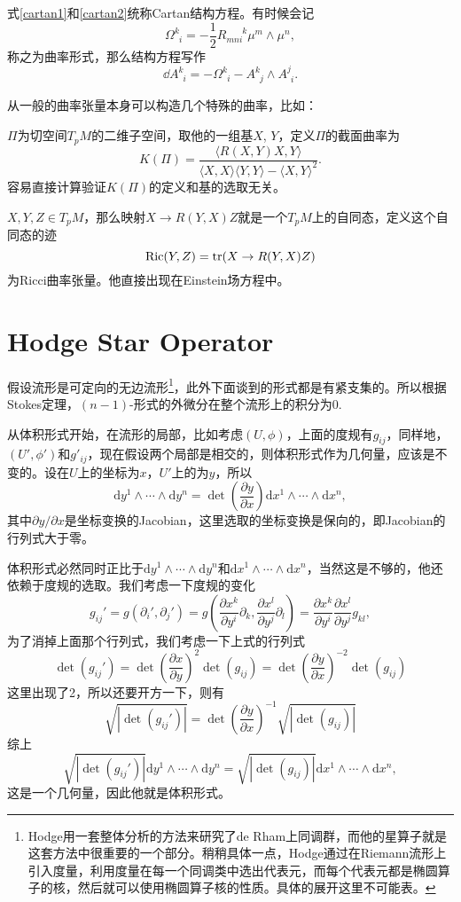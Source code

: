 式\eqref{cartan1}和\eqref{cartan2}统称Cartan结构方程。有时候会记
\[
	\Omega^{k}_{\phantom{k}i}=-\frac{1}{2}R_{mni}^{\phantom{mni}k} \mu^m\wedge\mu^n,
\]
称之为曲率形式，那么结构方程写作
\[
	\dd A^{k}_{\phantom{k}i}=-\Omega^{k}_{\phantom{k}i}-A^{k}_{\phantom{k}j}\wedge A^{j}_{\phantom{j}i}.
\]

从一般的曲率张量本身可以构造几个特殊的曲率，比如：

\para $\Pi$为切空间$T_pM$的二维子空间，取他的一组基$X$, $Y$，定义$\Pi$的截面曲率为
\[
	K(\Pi)=\frac{\langle R(X,Y)X,Y\rangle}{\langle X,X\rangle\langle Y,Y \rangle-\langle X,Y \rangle^2}.
\]
容易直接计算验证$K(\Pi)$的定义和基的选取无关。

\para $X,Y,Z\in T_p M$，那么映射$X\to R(Y,X)Z$就是一个$T_p M$上的自同态，定义这个自同态的迹
\[
	\mathrm{Ric}(Y,Z)=\operatorname{tr} (X\to R(Y,X)Z)
\]
为Ricci曲率张量。他直接出现在Einstein场方程中。

\section{Hodge Star Operator}

假设流形是可定向的无边流形\footnote{Hodge用一套整体分析的方法来研究了de Rham上同调群，而他的星算子就是这套方法中很重要的一个部分。稍稍具体一点，Hodge通过在Riemann流形上引入度量，利用度量在每一个同调类中选出代表元，而每个代表元都是椭圆算子的核，然后就可以使用椭圆算子核的性质。具体的展开这里不可能表。}，此外下面谈到的形式都是有紧支集的。所以根据Stokes定理，$(n-1)$-形式的外微分在整个流形上的积分为0.

从体积形式开始，在流形的局部，比如考虑$(U,\phi)$，上面的度规有$g_{ij}$，同样地，$(U',\phi')$和$g'_{ij}$，现在假设两个局部是相交的，则体积形式作为几何量，应该是不变的。设在$U$上的坐标为$x$，$U'$上的为$y$，所以
\[
	\mathrm{d}y^1\wedge \cdots \wedge\mathrm{d}y^n=\det\left(\frac{\partial y}{\partial x}\right)\mathrm{d}x^1\wedge \cdots \wedge \mathrm{d}x^n,
\]
其中$\partial y/\partial x$是坐标变换的Jacobian，这里选取的坐标变换是保向的，即Jacobian的行列式大于零。

体积形式必然同时正比于$\mathrm{d}y^1\wedge \cdots \wedge \mathrm{d}y^n$和$\mathrm{d}x^1\wedge \cdots \wedge \mathrm{d}x^n$，当然这是不够的，他还依赖于度规的选取。我们考虑一下度规的变化
\[
	g_{ij}'=g(\partial_i',\partial_j')=g\left(\frac{\partial x^k}{\partial y^i}\partial_k,\frac{\partial x^l}{\partial y^j}\partial_l\right)=\frac{\partial x^k}{\partial y^i}\frac{\partial x^l}{\partial y^j}g_{kl},
\]
为了消掉上面那个行列式，我们考虑一下上式的行列式
\[
	\det(g_{ij}')=\det\left(\frac{\partial x}{\partial y}\right)^2\det(g_{ij})=\det\left(\frac{\partial y}{\partial x}\right)^{-2}\det(g_{ij})
\]
这里出现了2，所以还要开方一下，则有
\[
	\sqrt{|\det(g_{ij}')|}=\det\left(\frac{\partial y}{\partial x}\right)^{-1}\sqrt{|\det(g_{ij})|}
\]
综上
\[
	\sqrt{|\det(g_{ij}')|}\mathrm{d}y^1\wedge \cdots \wedge \mathrm{d}y^n=\sqrt{|\det(g_{ij})|}\mathrm{d}x^1\wedge \cdots \wedge \mathrm{d}x^n,
\]
这是一个几何量，因此他就是体积形式。

